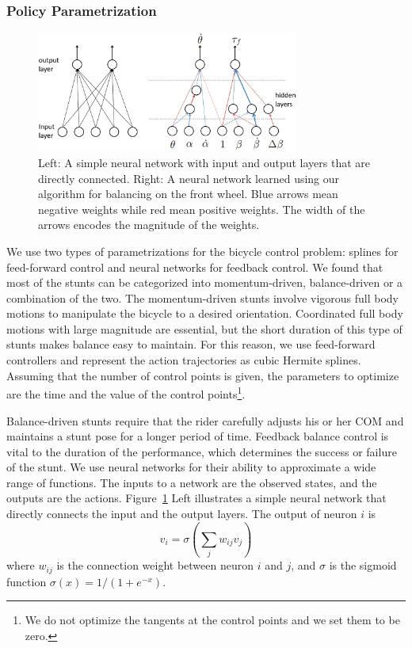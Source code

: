 \subsubsection{Policy Parametrization}
\label{sec:parametrization}

\begin{figure}[!t]
  \centering
  \includegraphics[width=3.4in]{figures/simpleNetwork}
  \caption{Left: A simple neural network with input and output layers that are directly connected. Right: A neural network learned using our algorithm for balancing on the front wheel. Blue arrows mean negative weights while red mean positive weights. The width of the arrows encodes the magnitude of the weights. }
  \label{fig:simpleNetwork}
\end{figure}

We use two types of parametrizations for the bicycle control problem: splines for feed-forward control and neural networks for feedback control. We found that most of the stunts can be categorized into momentum-driven, balance-driven or a combination of the two. The momentum-driven stunts involve vigorous full body motions to manipulate the bicycle to a desired orientation. Coordinated full body motions with large magnitude are essential, but the short duration of this type of stunts makes balance easy to maintain. For this reason, we use feed-forward controllers and represent the action trajectories as cubic Hermite splines. Assuming that the number of control points is given, the parameters to optimize are the time and the value of the control points\footnote{We do not optimize the tangents at the control points and we set them to be zero.}.

Balance-driven stunts require that the rider carefully adjusts his or her COM and maintains a stunt pose for a longer period of time. Feedback balance control is vital to the duration of the performance, which determines the success or failure of the stunt. We use neural networks for their ability to approximate a wide range of functions. The inputs to a network are the observed states, and the outputs are the actions. Figure~\ref{fig:simpleNetwork} Left illustrates a simple neural network that directly connects the input and the output layers. The output of neuron $i$ is
\begin{displaymath}
v_i=\sigma(\sum_j w_{ij} v_j)
\end{displaymath}
where $w_{ij}$ is the connection weight between neuron $i$ and $j$, and $\sigma$ is the sigmoid function $\sigma(x) = 1/(1+e^{-x})$.

